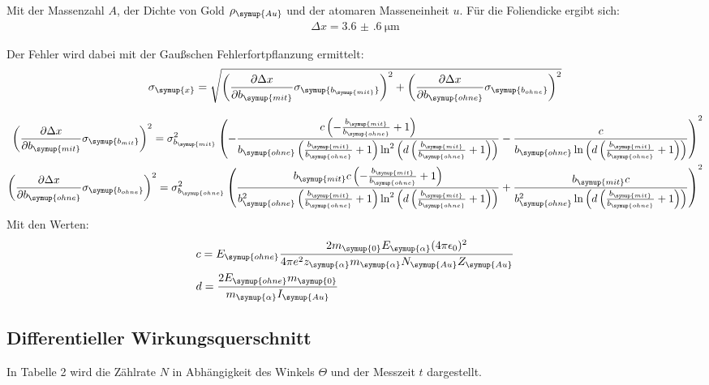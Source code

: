 Mit der Massenzahl $A$, der Dichte von Gold $\rho_{\symup{Au}}$ und der atomaren Masseneinheit $u$.
Für die Foliendicke ergibt sich:
\begin{align*}
  \Delta x = \SI{3.6(6)}{\micro\meter}
\end{align*}

Der Fehler wird dabei mit der Gaußschen Fehlerfortpflanzung ermittelt:
\begin{align*}
  \sigma_{\symup{x}} = \sqrt{\left(\frac{\partial \Delta x}{\partial b_{\symup{mit}}}\sigma_{\symup{b_{\symup{mit}}}}\right)^2 + \left(\frac{\partial \Delta x}{\partial b_{\symup{ohne}}}\sigma_{\symup{b_{ohne}}}\right)^2}
\end{align*}

\begin{align*}
  \left(\frac{\partial \Delta x}{\partial b_{\symup{mit}}}\sigma_{\symup{b_{mit}}}\right)^2 = \sigma_{b_{\symup{mit}}}^{2} \left(- \frac{c \left(- \frac{b_{\symup{mit}}}{b_{\symup{ohne}}} + 1\right)}{b_{\symup{ohne}} \left(\frac{b_{\symup{mit}}}{b_{\symup{ohne}}} + 1\right) \ln^{2}{\left (d \left(\frac{b_{\symup{mit}}}{b_{\symup{ohne}}} + 1\right) \right )}} - \frac{c}{b_{\symup{ohne}} \ln{\left (d \left(\frac{b_{\symup{mit}}}{b_{\symup{ohne}}} + 1\right) \right )}}\right)^{2} \\
  \left(\frac{\partial \Delta x}{\partial b_{\symup{ohne}}}\sigma_{\symup{b_{ohne}}}\right)^2 = \sigma_{b_{\symup{ohne}}}^{2} \left(\frac{b_{\symup{mit}} c \left(- \frac{b_{\symup{mit}}}{b_{\symup{ohne}}} + 1\right)}{b_{\symup{ohne}}^{2} \left(\frac{b_{\symup{mit}}}{b_{\symup{ohne}}} + 1\right) \ln^{2}{\left (d \left(\frac{b_{\symup{mit}}}{b_{\symup{ohne}}} + 1\right) \right )}} + \frac{b_{\symup{mit}} c}{b_{\symup{ohne}}^{2} \ln{\left (d \left(\frac{b_{\symup{mit}}}{b_{\symup{ohne}}} + 1\right) \right )}}\right)^{2}
\end{align*}
Mit den Werten:
\begin{align*}
  &c =  E_{\symup{ohne}} \frac{2 m_{\symup{0}} E_{\symup{\alpha}} (4 \pi \epsilon_0)^2}{4 \pi e^2 z_{\symup{\alpha}}  m_{\symup{\alpha}} N_{\symup{Au}} Z_{\symup{Au}}} \\
  &d = \frac{2 E_{\symup{ohne}} m_{\symup{0}}}{m_{\symup{\alpha}} I_{\symup{Au}}}
\end{align*}

\subsection{Differentieller Wirkungsquerschnitt}
\label{sec:wq}
In Tabelle 2 wird die Zählrate $N$ in Abhängigkeit des Winkels $\Theta$ und der Messzeit $t$ dargestellt.


